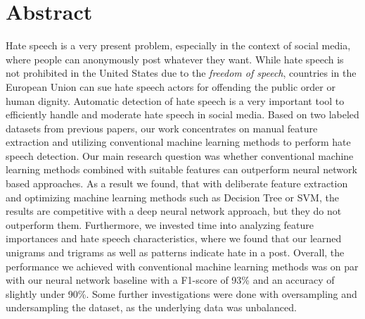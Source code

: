 \section*{Abstract}

Hate speech is a very present problem, especially in the context of social media, where people can anonymously post whatever they want. While hate speech is not prohibited in the United States due to the \textit{freedom of speech}, countries in the European Union can sue hate speech actors for offending the public order or human dignity. Automatic detection of hate speech is a very important tool to efficiently handle and moderate hate speech in social media. 
Based on two labeled datasets from previous papers, our work concentrates on manual feature extraction and utilizing conventional machine learning methods to perform hate speech detection. Our main research question was whether conventional machine learning methods combined with suitable features can outperform neural network based approaches. As a result we found, that with deliberate feature extraction and optimizing machine learning methods such as Decision Tree or SVM, the results are competitive with a deep neural network approach, but they do not outperform them. Furthermore, we invested time into analyzing feature importances and hate speech characteristics, where we found that our learned unigrams and trigrams as well as patterns indicate hate in a post.
Overall, the performance we achieved with conventional machine learning methods was on par with our neural network baseline with a F1-score of 93\% and an accuracy of slightly under 90\%.
Some further investigations were done with oversampling and undersampling the dataset, as the underlying data was unbalanced.
